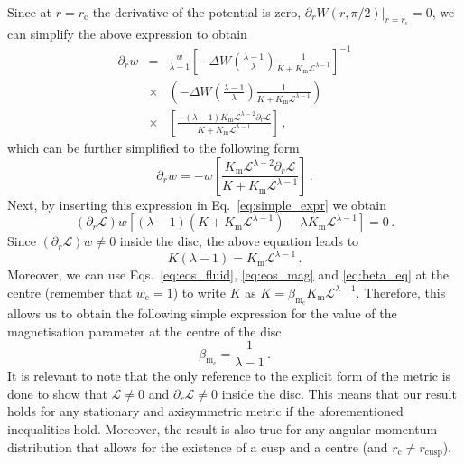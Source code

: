 \documentclass{aa}
\begin{document}
\begin{appendix}
\begin{eqnarray}
\end{eqnarray}
Since at $r = r_{\mathrm{c}}$ the derivative of the potential is zero, $\partial_r W(r, \pi/2)|_{r = r_{\mathrm{c}}} = 0$, we can simplify the above expression to obtain
\begin{eqnarray}
\partial_r w &=& \frac{w}{\lambda - 1} \left[-\Delta W \left(\frac{\lambda -1}{\lambda}\right)\frac{1}{K+K_{\mathrm{m}}\mathcal{L}^{\lambda - 1}}\right]^{-1} 
\nonumber \\
&\times&
\left(-\Delta W \left(\frac{\lambda -1}{\lambda}\right)\frac{1}{K+K_{\mathrm{m}}\mathcal{L}^{\lambda - 1}}\right)
\nonumber \\
&\times&\left[\frac{-(\lambda - 1) K_{\mathrm{m}} \mathcal{L}^{\lambda - 2} \partial_r \mathcal{L}}{K+K_{\mathrm{m}}\mathcal{L}^{\lambda - 1}}\right]\,,
\end{eqnarray}
which can be further simplified to the following form
\begin{equation}
\partial_r w = - w \left[\frac{K_{\mathrm{m}} \mathcal{L}^{\lambda - 2} \partial_r \mathcal{L}}{K+K_{\mathrm{m}}\mathcal{L}^{\lambda - 1}}\right]\,.
\end{equation}
Next, by inserting this expression in Eq.~\eqref{eq:simple_expr} we obtain
\begin{equation}
(\partial_r \mathcal{L}) w [(\lambda -1)(K+K_{\mathrm{m}}\mathcal{L}^{\lambda - 1}) - \lambda K_{\mathrm{m}}\mathcal{L}^{\lambda - 1}] = 0\,.
\end{equation}
Since $(\partial_r \mathcal{L}) w \neq 0$ inside the disc, the above equation leads to 
\begin{equation}
K (\lambda - 1) = K_{\mathrm{m}}\mathcal{L}^{\lambda - 1}\,.
\end{equation}
Moreover, we can use Eqs.~\eqref{eq:eos_fluid}, \eqref{eq:eos_mag} and \eqref{eq:beta_eq} at the centre (remember that $w_{\mathrm{c}} = 1$) to write $K$ as $K = \beta_{\mathrm{m}_{\mathrm{c}}} K_\mathrm{m}\mathcal{L}^{\lambda -1}$. Therefore, this allows us to obtain the following simple expression for the value of the magnetisation parameter at the centre of the disc
\begin{equation}
\beta_{\mathrm{m}_{\mathrm{c}}} = \frac{1}{\lambda - 1}\,.
\end{equation}
It is relevant to note that the only reference to the explicit form of the metric is done to show that $\mathcal{L} \neq 0$ and $\partial_r \mathcal{L} \neq 0$ inside the disc. This means that our result holds for any stationary and axisymmetric metric if the aforementioned inequalities hold. Moreover, the result is also true for any angular momentum distribution that allows for the existence of a cusp and a centre (and $r_{\mathrm{c}} \neq r_{\mathrm{cusp}}$).

\end{appendix}
\end{document}
